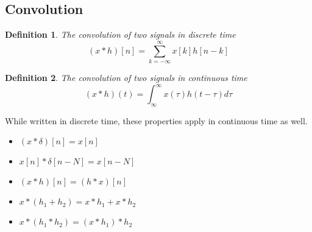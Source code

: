 \documentclass{article}
\newtheorem{definition}{Definition}
\begin{document}
\subsection{Convolution}
\begin{definition}
    The convolution of two signals in discrete time
    $$(x*h)[n] = \sum_{k=-\infty}^{\infty}{x[k]h[n-k]}$$
\end{definition}
\begin{definition}
    The convolution of two signals in continuous time
    $$(x*h)(t) = \int_{\infty}^{\infty}{x(\tau)h(t-\tau)d\tau}$$
\end{definition}
While written in discrete time, these properties apply in continuous time as well.
\begin{itemize}
    \item $(x*\delta)[n] = x[n]$
    \item $x[n]*\delta[n-N]=x[n-N]$
    \item $(x*h)[n] = (h*x)[n]$
    \item $x * (h_1 + h_2) = x*h_1 + x*h_2$
    \item $x * (h_1 * h_2) = (x * h_1) * h_2$
\end{itemize}
\end{document}
